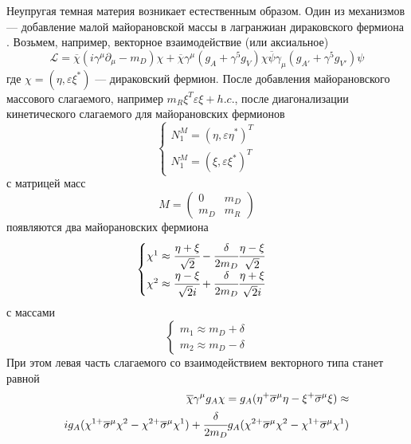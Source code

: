 Неупругая темная материя возникает естественным образом. 
Один из механизмов --- добавление малой майорановской массы в лагранжиан дираковского фермиона \cite{PhysRevD.64.043502}.
Возьмем, например, векторное взаимодействие (или аксиальное)
\begin{equation}
	\label{eq:DM_L_naive_kinemat}
	\mathcal{L} = \overline{\chi}(i\gamma^{\mu}\partial_{\mu} - m_D)\chi +
	\overline{\chi}\gamma^{\mu}(g_A + \gamma^5 g_V) \chi \overline{\psi}\gamma_{\mu}(g_{A'} + \gamma^5 g_{V'})\psi
\end{equation}
где $\chi = (\eta,\varepsilon \xi^*)$ --- дираковский фермион. После добавления майорановского массового слагаемого, например $m_R\xi^T\varepsilon \xi + h.c.$, после диагонализации кинетического слагаемого для майорановских фермионов
\begin{equation}
	\begin{cases}
		N_1^M = (\eta,\varepsilon\eta^*)^T\\
		N_1^M = (\xi,\varepsilon \xi^*)^T
	\end{cases}
\end{equation}
с матрицей масс
\begin{equation}
	M = 
	\begin{pmatrix}
		0 & m_D \\
		m_D & m_R
	\end{pmatrix}
\end{equation}
появляются два майорановских фермиона
\begin{equation}
	\begin{cases}
		\chi^1 \approx \cfrac{\eta + \xi}{\sqrt{2}} - \cfrac{\delta}{2m_D} \cfrac{\eta - \xi}{\sqrt{2} }\\
		\chi^2  \approx \cfrac{\eta - \xi}{\sqrt{2}i} + \cfrac{\delta}{2m_D} \cfrac{\eta + \xi}{\sqrt{2}i }\\
	\end{cases}
\end{equation}
с массами 
\begin{equation}
	\begin{cases}
		m_1 \approx m_D + \delta\\
		m_2 \approx m_D - \delta		
	\end{cases}
\end{equation}
При этом левая часть слагаемого со взаимодействием векторного типа станет равной
\begin{equation}
	\begin{split}
	\overline{\chi}\gamma^{\mu}g_A \chi = 
	g_A(\eta^+ \overline{\sigma}^{\mu} \eta - \xi^+ \overline{\sigma}^{\mu} \xi) \approx \\ 
	i g_A (\chi^{1+} \overline{\sigma}^{\mu} \chi^2 - \chi^{2+} \overline{\sigma}^{\mu} \chi^1) + \cfrac{\delta}{2m_D}g_A 
	(
		\chi^{2+} \overline{\sigma}^{\mu}\chi^2 - 
		\chi^{1+}  \overline{\sigma}^{\mu}\chi^1
	)
	\end{split}
\end{equation}
